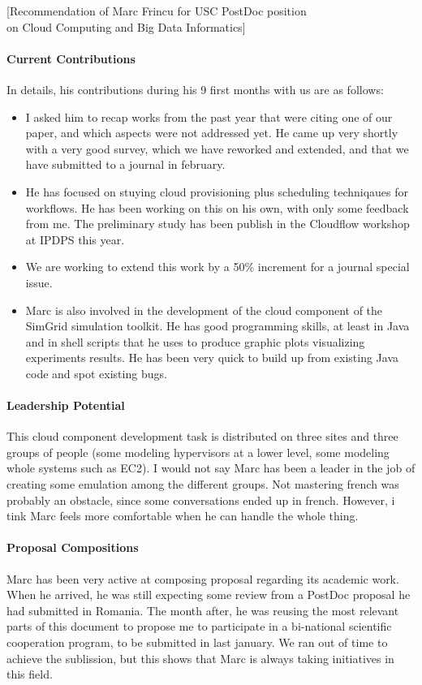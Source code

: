 \documentclass[a4paper,10pt]{article}
\begin{document}
\begin{letter}[Recommendation of Marc Frincu for USC PostDoc position\\
on Cloud Computing and Big Data Informatics]
\paragraph{Current Contributions}

In details, his contributions during his 9 first months with us are as follows:
\begin{itemize}
\item I asked him to recap works from  the past year that were citing one of our
  paper, and which aspects were not addressed  yet. He came up very shortly with
  a very  good survey,  which we have  reworked and extended,  and that  we have
  submitted to a journal in february.
\item He has  focused on stuying cloud provisioning  plus scheduling techniqaues
  for  workflows.  He  has been  working  on this  on  his own,  with only  some
  feedback from  me. The  preliminary study  has been  publish in  the Cloudflow
  workshop at IPDPS this year.
\item We  are working  to extend  this work by  a 50\%  increment for  a journal
  special issue.
\item Marc is also involved  in the development of  the cloud component  of the
  SimGrid simulation toolkit. He has good programming skills, at least in Java
  and in shell scripts that he uses to produce graphic plots visualizing experiments
  results. He has been very quick to build up from existing Java code and spot 
  existing bugs.  
\end{itemize}

\paragraph{Leadership Potential}
This cloud  component development task is  distributed on three sites  and three
groups of  people (some  modeling hypervisors  at a  lower level,  some modeling
whole systems such as  EC2).  I would not say Marc has been  a leader in the job
of creating some emulation among the different groups.  Not mastering french was
probably an obstacle,  since some conversations ended up in  french.  However, i
tink Marc feels more comfortable when he can handle the whole thing. 

\paragraph{Proposal Compositions}
Marc has been very active at composing proposal regarding its academic work. When 
he arrived, he was still expecting some review from a PostDoc proposal he had
submitted in Romania. The month after, he was reusing the most relevant parts
of this document to propose me to participate in a bi-national scientific
cooperation program, to be submitted in last january. We ran out of time to
achieve the sublission, but this shows that Marc is always taking initiatives
in this field. 


\end{letter}
\end{document}
